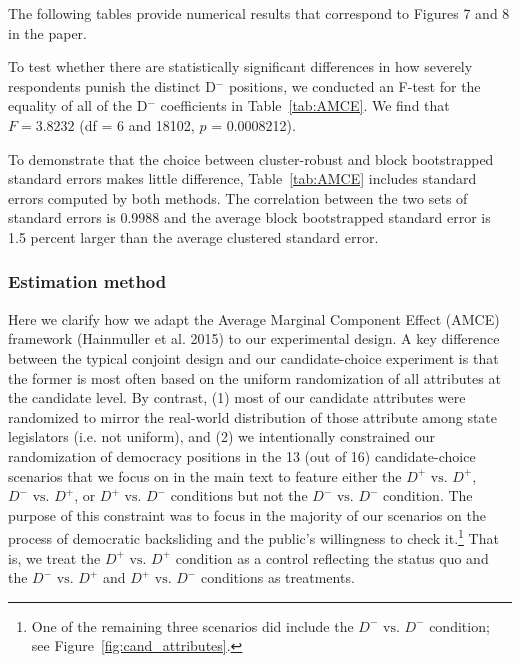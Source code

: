 \documentclass[12pt]{article}
\begin{document}
The following tables provide numerical results that correspond to Figures 7 and 8 in the paper.

To test whether there are statistically significant differences in how severely respondents punish the distinct D$^-$ positions, we conducted an F-test for the equality of all of the D$^-$ coefficients in Table~\ref{tab:AMCE}. We find that $F=3.8232$ (df = 6 and 18102, $p$ = 0.0008212).

To demonstrate that the choice between cluster-robust and block bootstrapped standard errors makes little difference, Table~\ref{tab:AMCE} includes standard errors computed by both methods. The correlation between the two sets of standard errors is 0.9988 and the average block bootstrapped standard error is 1.5 percent larger than the average clustered standard error.



\clearpage



\clearpage

\clearpage

\subsubsection{Estimation method}

\onehalfspacing

Here we clarify how we adapt the Average Marginal Component Effect (AMCE) framework (Hainmuller et al. 2015) to our experimental design. A key difference between the typical conjoint design and our candidate-choice experiment is that the former is most often based on the uniform randomization of all attributes at the candidate level. By contrast, (1) most of our candidate attributes were randomized to mirror the real-world distribution of those attribute among state legislators (i.e. not uniform), and (2) we intentionally constrained our randomization of democracy positions in the 13 (out of 16) candidate-choice scenarios that we focus on in the main text to feature either the $D^+ \text{ vs. } D^+$, $D^- \text{ vs. } D^+$, or $D^+ \text{ vs. } D^-$ conditions but not the $D^- \text{ vs. } D^-$ condition. The purpose of this constraint was to focus in the majority of our scenarios on the process of democratic backsliding and the public’s willingness to check it.\footnote{One of the remaining three scenarios did include the $D^- \text{ vs. } D^-$ condition; see Figure~\ref{fig:cand_attributes}.} That is, we treat the $D^+ \text{ vs. } D^+$ condition as a control reflecting the status quo and the $D^- \text{ vs. } D^+$ and $D^+ \text{ vs. } D^-$ conditions as treatments. 
\end{document}
